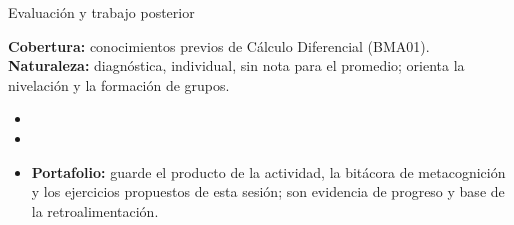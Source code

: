 \documentclass[10pt,aspectratio=169]{beamer}
\begin{document}
\begin{frame}{Evaluación y trabajo posterior}
  \small
  \begin{evalbox}
    \textbf{Cobertura:} conocimientos previos de Cálculo Diferencial (BMA01). \textbf{Naturaleza:} diagnóstica, individual, sin nota para el promedio; orienta la nivelación y la formación de grupos.
  \end{evalbox}
  \begin{itemize}
    \item \criterios
    \item \declaracionia
    \item \textbf{Portafolio:} guarde el producto de la actividad, la bitácora de metacognición y los ejercicios propuestos de esta sesión; son evidencia de progreso y base de la retroalimentación.
  \end{itemize}
\end{frame}
\end{document}
